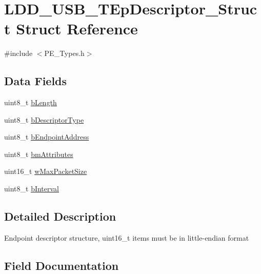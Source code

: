 \hypertarget{struct_l_d_d___u_s_b___t_ep_descriptor___struct}{}\section{L\+D\+D\+\_\+\+U\+S\+B\+\_\+\+T\+Ep\+Descriptor\+\_\+\+Struct Struct Reference}
\label{struct_l_d_d___u_s_b___t_ep_descriptor___struct}


{\ttfamily \#include $<$P\+E\+\_\+\+Types.\+h$>$}

\subsection*{Data Fields}
\begin{DoxyCompactItemize}
\item 
uint8\+\_\+t \hyperlink{struct_l_d_d___u_s_b___t_ep_descriptor___struct_ad4cc2b6088c7fb913f40eada94098393}{b\+Length}
\item 
uint8\+\_\+t \hyperlink{struct_l_d_d___u_s_b___t_ep_descriptor___struct_aecc71d9488627adeb5f7de1e71fc45d1}{b\+Descriptor\+Type}
\item 
uint8\+\_\+t \hyperlink{struct_l_d_d___u_s_b___t_ep_descriptor___struct_a62745d5a897f76419a136579b2fbca02}{b\+Endpoint\+Address}
\item 
uint8\+\_\+t \hyperlink{struct_l_d_d___u_s_b___t_ep_descriptor___struct_a7a3e6205355d7fa84899f23ac8e58490}{bm\+Attributes}
\item 
uint16\+\_\+t \hyperlink{struct_l_d_d___u_s_b___t_ep_descriptor___struct_a19e3e6b0524f2fcd25377f008c94c3c6}{w\+Max\+Packet\+Size}
\item 
uint8\+\_\+t \hyperlink{struct_l_d_d___u_s_b___t_ep_descriptor___struct_a17aac2d9a945d37748eb0422bb811df2}{b\+Interval}
\end{DoxyCompactItemize}


\subsection{Detailed Description}
Endpoint descriptor structure, uint16\+\_\+t items must be in little-\/endian format 

\subsection{Field Documentation}
\hypertarget{struct_l_d_d___u_s_b___t_ep_descriptor___struct_aecc71d9488627adeb5f7de1e71fc45d1}{}
